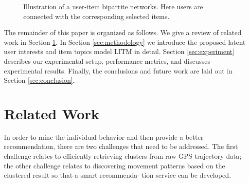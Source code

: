 \documentclass[conference]{IEEEtran}
\begin{document}
\begin{figure}[!ht]
   \centering
   \begin{center}
    
   \caption{Illustration of a user-item bipartite networks. Here users are connected with the corresponding selected items.}
   \label{fig:user-item-bipartite}
   \end{center}
\end{figure}




The remainder of this paper is organized as follows. We give a review of related work in Section \ref{sec:relatedwork}. In Section \ref{sec:methodology} we introduce the proposed latent user interests and item topics model LITM in detail. Section \ref{sec:experiment} describes our experimental setup, performance metrics, and discusses experimental results. Finally, the conclusions and future work are laid out in Section \ref{sec:conclusion}.





\section{Related Work}\label{sec:relatedwork}
In order to mine the individual behavior and then provide a better recommendation, there are two challenges that need to be addressed. The first 
challenge relates to efficiently retrieving clusters from raw GPS trajectory data; the other challenge relates to discovering movement patterns based on 
the clustered result so that a smart recommenda- tion service can be developed.
\end{document}
